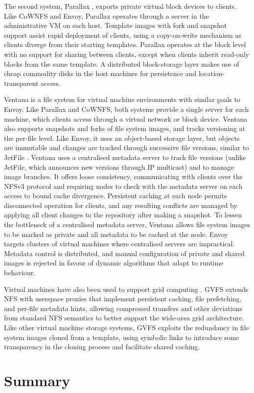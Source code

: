 The second system, Parallax \cite{warfield}, exports private virtual block devices to clients. Like CoWNFS and Envoy, Parallax operates through a server in the administrative VM on each host. Template images with fork and snapshot support assist rapid deployment of clients, using a copy-on-write mechanism as clients diverge from their starting templates. Parallax operates at the block level with no support for sharing between clients, except when clients inherit read-only blocks from the same template. A distributed block-storage layer makes use of cheap commodity disks in the host machines for persistence and location-transparent access.

Ventana \cite{pfaff} is a file system for virtual machine environments with similar goals to Envoy. Like Parallax and CoWNFS, both systems provide a single server for each machine, which clients access through a virtual network or block device. Ventana also supports snapshots and forks of file system images, and tracks versioning at the per-file level. Like Envoy, it uses an object-based storage layer, but objects are immutable and changes are tracked through successive file versions, similar to JetFile \cite{gronvall}. Ventana uses a centralised metadata server to track file versions (unlike JetFile, which announces new versions through IP multicast) and to manage image branches. It offers loose consistency, communicating with clients over the NFSv3 protocol and requiring nodes to check with the metadata server on each access to bound cache divergence. Persistent caching at each node permits disconnected operation for clients, and any resulting conflicts are managed by applying all client changes to the repository after making a snapshot. To lessen the bottleneck of a centralised metadata server, Ventana allows file system images to be marked as private and all metadata to be cached at the node. Envoy targets clusters of virtual machines where centralised servers are impractical. Metadata control is distributed, and manual configuration of private and shared images is rejected in favour of dynamic algorithms that adapt to runtime behaviour.

Virtual machines have also been used to support grid computing \cite{figueiredo03}. GVFS \cite{zhao04} extends NFS with userspace proxies that implement persistent caching, file prefetching, and per-file metadata hints, allowing compressed transfers and other deviations from standard NFS semantics to better support the wide-area grid architecture. Like other virtual machine storage systems, GVFS exploits the redundancy in file system images cloned from a template, using symbolic links to introduce some transparency in the cloning process and facilitate shared caching.

\section{Summary}

% 
% 

